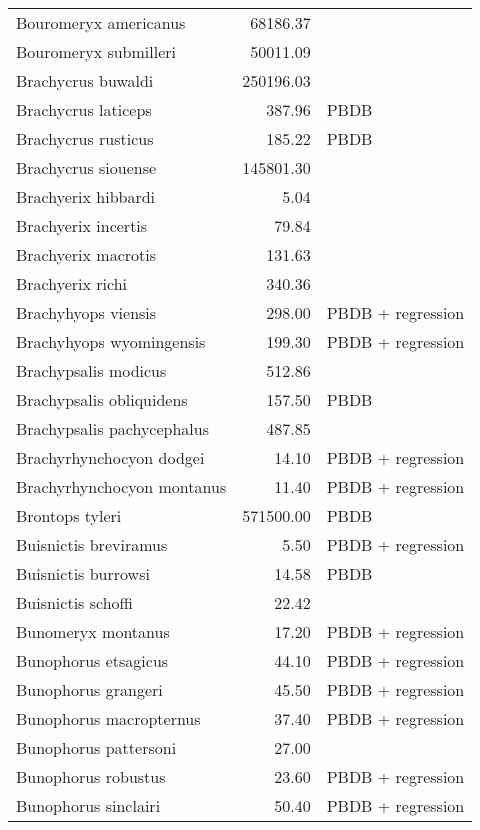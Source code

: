 \begin{table}[ht]
\begin{tabular}{lrl}
  Bouromeryx americanus & 68186.37 & \cite{Tomiya2013} \\ 
  Bouromeryx submilleri & 50011.09 & \cite{Tomiya2013} \\ 
  Brachycrus buwaldi & 250196.03 & \cite{Tomiya2013} \\ 
  Brachycrus laticeps & 387.96 & PBDB \\ 
  Brachycrus rusticus & 185.22 & PBDB \\ 
  Brachycrus siouense & 145801.30 & \cite{Tomiya2013} \\ 
  Brachyerix hibbardi & 5.04 & \cite{Clemens2011} \\ 
  Brachyerix incertis & 79.84 & \cite{Tomiya2013} \\ 
  Brachyerix macrotis & 131.63 & \cite{Tomiya2013} \\ 
  Brachyerix richi & 340.36 & \cite{Tomiya2013} \\ 
  Brachyhyops viensis & 298.00 & PBDB + regression \\ 
  Brachyhyops wyomingensis & 199.30 & PBDB + regression \\ 
  Brachypsalis modicus & 512.86 & \cite{Tomiya2013} \\ 
  Brachypsalis obliquidens & 157.50 & PBDB \\ 
  Brachypsalis pachycephalus & 487.85 & \cite{Tomiya2013} \\ 
  Brachyrhynchocyon dodgei & 14.10 & PBDB + regression \\ 
  Brachyrhynchocyon montanus & 11.40 & PBDB + regression \\ 
  Brontops tyleri & 571500.00 & PBDB \\ 
  Buisnictis breviramus & 5.50 & PBDB + regression \\ 
  Buisnictis burrowsi & 14.58 & PBDB \\ 
  Buisnictis schoffi & 22.42 & \cite{Tomiya2013} \\ 
  Bunomeryx montanus & 17.20 & PBDB + regression \\ 
  Bunophorus etsagicus & 44.10 & PBDB + regression \\ 
  Bunophorus grangeri & 45.50 & PBDB + regression \\ 
  Bunophorus macropternus & 37.40 & PBDB + regression \\ 
  Bunophorus pattersoni & 27.00 & \cite{Macdonald1956} \\ 
  Bunophorus robustus & 23.60 & PBDB + regression \\ 
  Bunophorus sinclairi & 50.40 & PBDB + regression \\ 

\end{tabular}
\end{table}
